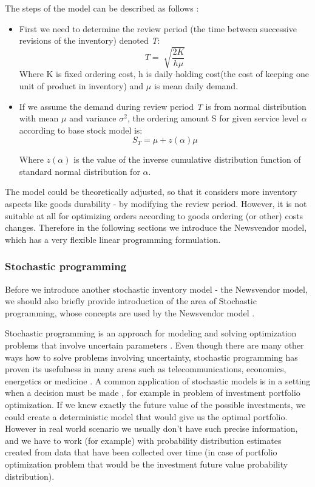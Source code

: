 \documentclass[11pt,a4paper]{article}
\begin{document}
The steps of the model can be described as follows \cite{supply}:
\begin{itemize}
\item First we need to determine the review period (the time between successive revisions of the inventory) denoted \textit{T}:
\begin{equation}
T = \sqrt[]{\frac{2K}{h\mu}}
\end{equation}
Where K is fixed ordering cost, h is daily holding cost(the cost of keeping one unit of product in inventory) and $\mu$ is mean daily demand.

\item If we assume the demand during review period \textit{T} is from normal distribution with mean $\mu$ and variance $\sigma^2$, the ordering amount S for given service level $\alpha$ according to base stock model is:
\begin{equation}
S_T = \mu + z(\alpha)\mu
\end{equation}

Where $z(\alpha)$ is the value of the inverse cumulative distribution function of standard normal distribution for $\alpha$.
\end{itemize}
The model could be theoretically adjusted, so that it considers more inventory aspects like goods durability - by modifying the review period.
However, it is not suitable at all for optimizing orders according to goods ordering (or other) costs changes. Therefore in the following sections we introduce the Newsvendor model, which has a very flexible linear programming formulation.

\subsubsection{Stochastic programming}

Before we introduce another stochastic inventory model - the Newsvendor model, we should also briefly provide introduction of the area of Stochastic programming, whose concepts are used by the Newsvendor model \cite{sp_book}.


Stochastic programming is an approach for modeling and solving optimization problems that involve uncertain parameters \cite{sp_tut}. Even though there are many other ways how to solve problems involving uncertainty, stochastic programming has proven its usefulness in many areas such as telecommunications, economics, energetics or medicine \cite{sp_book} \cite{hydro} \cite{surgery} \cite{telco}. A common application of stochastic models is in a setting when a decision must be made \cite{sp_book}, for example in problem of investment portfolio optimization. If we knew exactly the future value of the possible investments, we could create a deterministic model that would give us the optimal portfolio. However in real world scenario we usually don’t have such precise information, and we have to work (for example) with probability distribution estimates created from data that have been collected over time (in case of portfolio optimization problem that would be the investment future value probability distribution).
\end{document}
